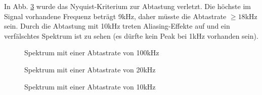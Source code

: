 \documentclass[conference]{IEEEtran}
\begin{document}
In Abb. \ref{fig:fft3} wurde das Nyquist-Kriterium zur Abtastung verletzt. Die höchste im Signal vorhandene Frequenz beträgt 9kHz, daher müsste die Abtastrate $\ge 18$kHz sein. Durch die Abtastung mit 10kHz treten Aliasing-Effekte auf und ein verfälschtes Spektrum ist zu sehen (es dürfte kein Peak bei 1kHz vorhanden sein).

\begin{figure}[h!]
  	\centering
    \scalebox{.5}{}
    \caption{Spektrum mit einer Abtastrate von 100kHz}
    \label{fig:fft1}
\end{figure}
\begin{figure}[h!]
  	\centering
    \scalebox{.5}{}
    \caption{Spektrum mit einer Abtastrate von 20kHz}
    \label{fig:fft2}
\end{figure}
\begin{figure}[h!]
  	\centering
    \scalebox{.5}{}
    \caption{Spektrum mit einer Abtastrate von 10kHz}
    \label{fig:fft3}
\end{figure}
\end{document}
